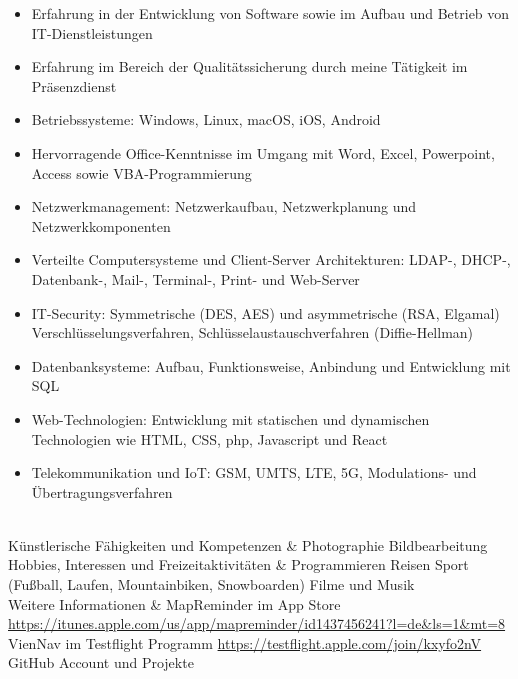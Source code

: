 \begin{longtabu}
\begin{itemize}[nosep,leftmargin=1em]
	\item Erfahrung in der Entwicklung von Software sowie im Aufbau und Betrieb von IT-Dienstleistungen
	\item Erfahrung im Bereich der Qualitätssicherung durch meine Tätigkeit im Präsenzdienst
	\item Betriebssysteme: Windows, Linux, macOS, iOS, Android
	\item Hervorragende Office-Kenntnisse im Umgang mit Word, Excel, Powerpoint, Access sowie VBA-Programmierung
	\item Netzwerkmanagement: Netzwerkaufbau, Netzwerkplanung und Netzwerkkomponenten
	\item Verteilte Computersysteme und Client-Server Architekturen: LDAP-, DHCP-, Datenbank-, Mail-, Terminal-, Print- und Web-Server
	\item IT-Security: Symmetrische (DES, AES) und asymmetrische (RSA, Elgamal) Verschlüsselungsverfahren, Schlüsselaustauschverfahren (Diffie-Hellman)
	\item Datenbanksysteme: Aufbau, Funktionsweise, Anbindung und Entwicklung mit SQL
	\item Web-Technologien: Entwicklung mit statischen und dynamischen Technologien wie HTML, CSS, php, Javascript und React
	\item Telekommunikation und IoT: GSM, UMTS, LTE, 5G, Modulations- und Übertragungsverfahren %
	\end{itemize} \\
	Künstlerische Fähigkeiten und Kompetenzen &
	\tabitem Photographie \newline
	\tabitem Bildbearbeitung \\ \bottomrule
	Hobbies, Interessen und Freizeitaktivitäten &
	\tabitem Programmieren \newline
	\tabitem Reisen \newline
	\tabitem Sport (Fußball, Laufen, Mountainbiken, Snowboarden) \newline
	\tabitem Filme und Musik \\ \bottomrule
	Weitere Informationen &
	MapReminder im App Store \newline
	\small{\url{https://itunes.apple.com/us/app/mapreminder/id1437456241?l=de&ls=1&mt=8}} \newline
	VienNav im Testflight Programm \newline
	\small{\url{https://testflight.apple.com/join/kxyfo2nV}} \newline
	GitHub Account und Projekte \newline

\end{longtabu}
